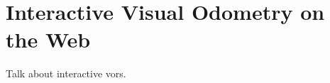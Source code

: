 \chapter{Interactive Visual Odometry on the Web}%
\label{cha:interactive_vo_on_the_web}

\minitoc%

Talk about interactive vors.
